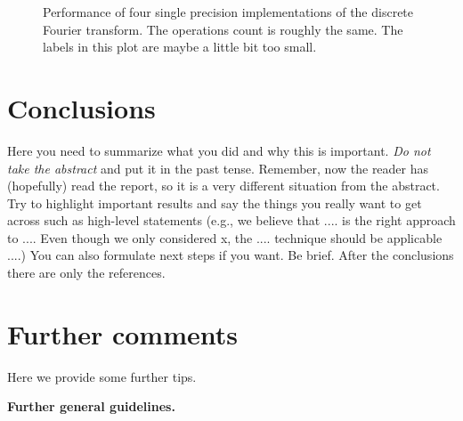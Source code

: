 \documentclass[letterpaper]{article}
\newcommand{\mypar}[1]{{\bf #1.}}
\begin{document}
\begin{figure}\centering
  \caption{Performance of four single precision implementations of the
  discrete Fourier transform. The operations count is roughly the
  same. The labels in this plot are maybe a little bit too small.\label{fftperf}}
\end{figure}

\section{Conclusions}

Here you need to summarize what you did and why this is
important. {\em Do not take the abstract} and put it in the past
tense. Remember, now the reader has (hopefully) read the report, so it
is a very different situation from the abstract. Try to highlight
important results and say the things you really want to get across
such as high-level statements (e.g., we believe that .... is the right
approach to .... Even though we only considered x, the
.... technique should be applicable ....) You can also formulate next
steps if you want. Be brief. After the conclusions there are only the references.

\section{Further comments}

Here we provide some further tips.

\mypar{Further general guidelines}
\end{document}
